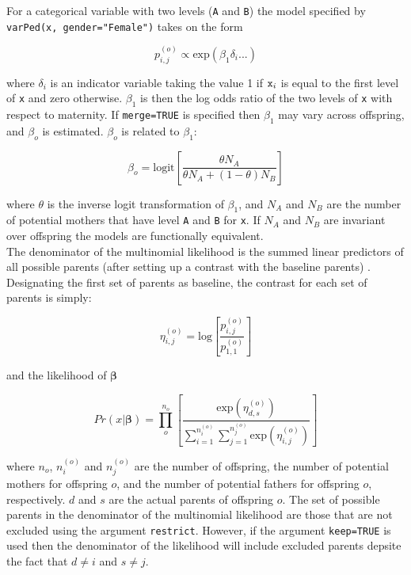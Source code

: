 \documentclass{article}
\begin{document}
For a categorical variable with two levels (\texttt{A} and \texttt{B}) the model specified by \texttt{varPed(x, gender="Female")} takes on the form

\begin{equation}
p^{(o)}_{i,j} \propto \textrm{exp}(\beta_{1}\delta_{i}...)
\end{equation}

where $\delta_{i}$ is an indicator variable taking the value 1 if $\textrm{\texttt{x}}_{i}$ is equal to the first level of \texttt{x} and zero otherwise. $\beta_{1}$ is then the log odds ratio of the two levels of \texttt{x} with respect to maternity.  If \texttt{merge=TRUE} is specified then $\beta_{1}$ may vary across offspring, and $\beta_{o}$ is estimated. $\beta_{o}$ is related to $\beta_{1}$:

\begin{equation}
\beta_{o}  = \textrm{logit}\left[\frac{\theta N_{A}}{\theta N_{A} + (1-\theta)N_{B}}\right]
\end{equation}

where $\theta$ is the inverse logit transformation of $\beta_{1}$, and $N_{A}$ and $N_{B}$ are the number of potential mothers that have level \texttt{A} and \texttt{B} for \texttt{x}. If $N_{A}$ and $N_{B}$ are invariant over offspring the models are functionally equivalent.\\

The denominator of the multinomial likelihood is the summed linear predictors of all possible parents (after setting up a contrast with the baseline parents) \citep{Smouse.1999}.  Designating the first set of parents as baseline, the contrast for each set of parents is simply:

\begin{equation}
\eta^{(o)}_{i,j}  = \textrm{log}\left[\frac{p^{(o)}_{i,j}}{p^{(o)}_{1,1}}\right]
\end{equation}

and the likelihood of $\bm{\beta}$

\begin{equation}
Pr(x|\bm{\beta})  = \prod^{n_{o}}_{o}\left[\frac{\textrm{exp}(\eta^{(o)}_{d,s})}{\sum^{n^{(o)}_{i}}_{i=1}\sum^{n^{(o)}_{j}}_{j=1}\textrm{exp}(\eta^{(o)}_{i,j})}\right] 
\end{equation}

where $n_{o}$, $n^{(o)}_{i}$ and $n^{(o)}_{j}$ are the number of offspring, the number of potential mothers for offspring $o$, and the number of potential fathers for offspring $o$, respectively.  $d$ and $s$ are the actual parents of offspring $o$. The set of possible parents  in the denominator of the multinomial likelihood are those that are not excluded using the argument \texttt{restrict}. However, if the argument \texttt{keep=TRUE} is used then the denominator of the likelihood will include excluded parents depsite the fact that $d \neq i$ and $s \neq j$.




\end{document}
